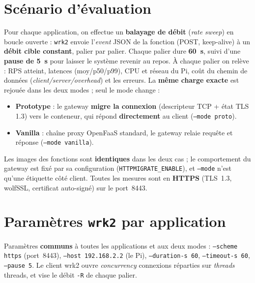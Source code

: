 \documentclass[10pt,a4paper]{article}
\newcommand{\code}[1]{\texttt{\small #1}}
\begin{document}
\section{Scénario d'évaluation}
Pour chaque application, on effectue un \textbf{balayage de débit} (\emph{rate sweep}) en boucle
ouverte : \code{wrk2} envoie l'\emph{event} JSON de la fonction (POST, keep-alive) à un \textbf{débit
cible constant}, palier par palier. Chaque palier dure \textbf{60~s}, suivi d'une \textbf{pause de 5~s}
pour laisser le système revenir au repos. À chaque palier on relève : RPS atteint, latences
(moy/p50/p99), CPU et réseau du Pi, coût du chemin de données (\emph{client/server/overhead}) et les
erreurs. La \textbf{même charge exacte} est rejouée dans les deux modes ; seul le mode change :
\begin{itemize}
\item \textbf{Prototype} : le gateway \textbf{migre la connexion} (descripteur TCP + état TLS 1.3) vers
le conteneur, qui répond \textbf{directement} au client (\code{--mode proto}).
\item \textbf{Vanilla} : chaîne proxy OpenFaaS standard, le gateway relaie requête et réponse
(\code{--mode vanilla}).
\end{itemize}
Les images des fonctions sont \textbf{identiques} dans les deux cas ; le comportement du gateway est
fixé par sa configuration (\code{HTTPMIGRATE\_ENABLE}), et \code{--mode} n'est qu'une étiquette côté
client. Toutes les mesures sont en \textbf{HTTPS} (TLS~1.3, wolfSSL, certificat auto-signé) sur le
port~8443.

\section{Paramètres \code{wrk2} par application}
Paramètres \textbf{communs} à toutes les applications et aux deux modes : \code{--scheme https}
(port~8443), \code{--host 192.168.2.2} (le Pi), \code{--duration-s 60}, \code{--timeout-s 60},
\code{--pause 5}. Le client wrk2 ouvre \emph{concurrency} connexions réparties sur \emph{threads}
threads, et vise le débit \code{-R} de chaque palier.
\end{document}
